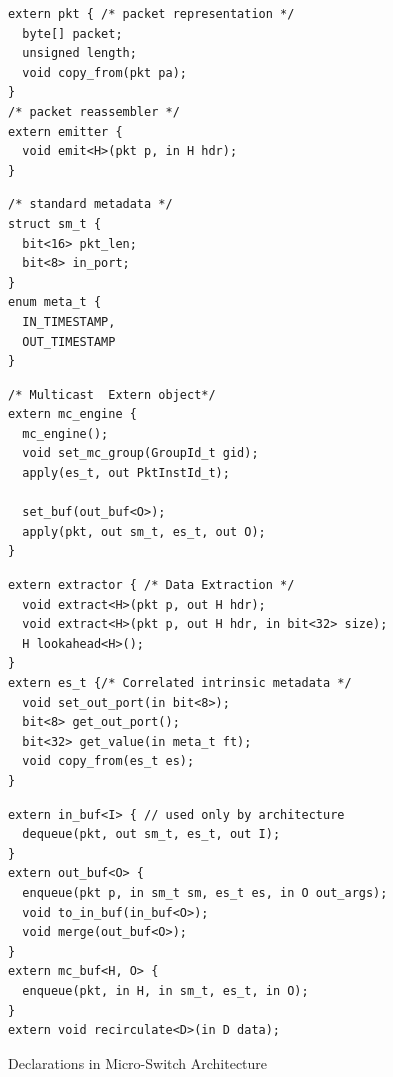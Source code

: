 \documentclass[letterpaper,twocolumn,10pt]{article}
\begin{document}
\begin{figure}
\begin{minipage}[t]{.38\textwidth}
\begin{lstlisting}[frame=none]
extern pkt { /* packet representation */
  byte[] packet; 
  unsigned length;
  void copy_from(pkt pa);
}
/* packet reassembler */
extern emitter {
  void emit<H>(pkt p, in H hdr);
}
\end{lstlisting}
\end{minipage}\vline
\hfill\begin{minipage}[t]{.22\textwidth}
\begin{lstlisting}[frame=none]
/* standard metadata */
struct sm_t { 
  bit<16> pkt_len;
  bit<8> in_port;
}
enum meta_t {
  IN_TIMESTAMP,
  OUT_TIMESTAMP 
}
\end{lstlisting}
\end{minipage}\vline
\hfill\begin{minipage}[t]{.35\textwidth}
\begin{lstlisting}[frame=none]
/* Multicast  Extern object*/
extern mc_engine {
  mc_engine();
  void set_mc_group(GroupId_t gid);
  apply(es_t, out PktInstId_t);
  
  set_buf(out_buf<O>);
  apply(pkt, out sm_t, es_t, out O);  
}
\end{lstlisting}
\end{minipage}
\begin{minipage}[t]{0.47\textwidth}
\begin{lstlisting}[frame=none]
extern extractor { /* Data Extraction */
  void extract<H>(pkt p, out H hdr);
  void extract<H>(pkt p, out H hdr, in bit<32> size);
  H lookahead<H>();
}
extern es_t {/* Correlated intrinsic metadata */
  void set_out_port(in bit<8>);
  bit<8> get_out_port();
  bit<32> get_value(in meta_t ft);
  void copy_from(es_t es);
}
\end{lstlisting}
\end{minipage}\vline
\hfill\noindent\begin{minipage}[t]{0.52\textwidth}
\begin{lstlisting}[frame=none]
extern in_buf<I> { // used only by architecture
  dequeue(pkt, out sm_t, es_t, out I);
}
extern out_buf<O> {
  enqueue(pkt p, in sm_t sm, es_t es, in O out_args);
  void to_in_buf(in_buf<O>);
  void merge(out_buf<O>);
}
extern mc_buf<H, O> {
  enqueue(pkt, in H, in sm_t, es_t, in O);
}
extern void recirculate<D>(in D data);
\end{lstlisting}
\end{minipage}
\caption{Declarations in Micro-Switch Architecture}
\label{fig:micro-switch-architecture}
\end{figure}
\end{document}
